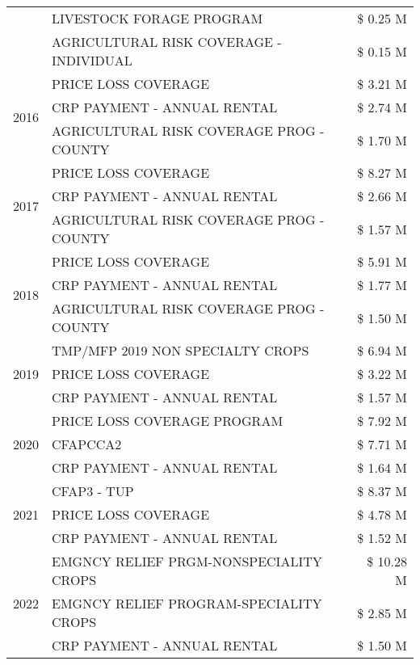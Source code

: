 \begin{tabular}{llr}
 & LIVESTOCK FORAGE PROGRAM & \$ 0.25 M \\
 & AGRICULTURAL RISK COVERAGE - INDIVIDUAL & \$ 0.15 M \\
\cline{1-3}
\multirow[t]{3}{*}{2016} & PRICE LOSS COVERAGE & \$ 3.21 M \\
 & CRP PAYMENT - ANNUAL RENTAL & \$ 2.74 M \\
 & AGRICULTURAL RISK COVERAGE PROG - COUNTY & \$ 1.70 M \\
\cline{1-3}
\multirow[t]{3}{*}{2017} & PRICE LOSS COVERAGE & \$ 8.27 M \\
 & CRP PAYMENT - ANNUAL RENTAL & \$ 2.66 M \\
 & AGRICULTURAL RISK COVERAGE PROG - COUNTY & \$ 1.57 M \\
\cline{1-3}
\multirow[t]{3}{*}{2018} & PRICE LOSS COVERAGE & \$ 5.91 M \\
 & CRP PAYMENT - ANNUAL RENTAL & \$ 1.77 M \\
 & AGRICULTURAL RISK COVERAGE PROG - COUNTY & \$ 1.50 M \\
\cline{1-3}
\multirow[t]{3}{*}{2019} & TMP/MFP 2019 NON SPECIALTY CROPS & \$ 6.94 M \\
 & PRICE LOSS COVERAGE & \$ 3.22 M \\
 & CRP PAYMENT - ANNUAL RENTAL & \$ 1.57 M \\
\cline{1-3}
\multirow[t]{3}{*}{2020} & PRICE LOSS COVERAGE PROGRAM & \$ 7.92 M \\
 & CFAPCCA2 & \$ 7.71 M \\
 & CRP PAYMENT - ANNUAL RENTAL & \$ 1.64 M \\
\cline{1-3}
\multirow[t]{3}{*}{2021} & CFAP3 - TUP & \$ 8.37 M \\
 & PRICE LOSS COVERAGE & \$ 4.78 M \\
 & CRP PAYMENT - ANNUAL RENTAL & \$ 1.52 M \\
\cline{1-3}
\multirow[t]{3}{*}{2022} & EMGNCY RELIEF PRGM-NONSPECIALITY CROPS & \$ 10.28 M \\
 & EMGNCY RELIEF PROGRAM-SPECIALITY CROPS & \$ 2.85 M \\
 & CRP PAYMENT - ANNUAL RENTAL & \$ 1.50 M \\
\cline{1-3}
\bottomrule
\end{tabular}
